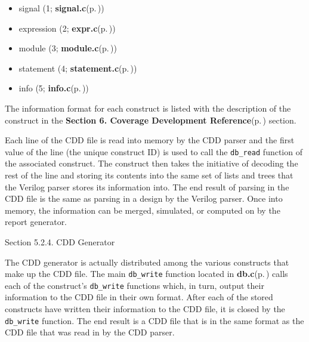 \begin{Desc}
\item[]\begin{itemize}
\item signal (1; {\bf signal.c}{\rm (p.\,\pageref{signal_8c})}) \item expression (2; {\bf expr.c}{\rm (p.\,\pageref{expr_8c})}) \item module (3; {\bf module.c}{\rm (p.\,\pageref{module_8c})}) \item statement (4; {\bf statement.c}{\rm (p.\,\pageref{statement_8c})}) \item info (5; {\bf info.c}{\rm (p.\,\pageref{info_8c})}) \end{itemize}
\end{Desc}
\begin{Desc}
\item[]The information format for each construct is listed with the description of the construct in the {\bf Section 6.  Coverage Development Reference}{\rm (p.\,\pageref{page_code_details})} section.\end{Desc}
\begin{Desc}
\item[]Each line of the CDD file is read into memory by the CDD parser and the first value of the line (the unique construct ID) is used to call the {\tt db\_\-read} function of the associated construct. The construct then takes the initiative of decoding the rest of the line and storing its contents into the same set of lists and trees that the Verilog parser stores its information into. The end result of parsing in the CDD file is the same as parsing in a design by the Verilog parser. Once into memory, the information can be merged, simulated, or computed on by the report generator.\end{Desc}




\begin{Desc}
\item[Section 5.2.4. CDD Generator]\end{Desc}
\begin{Desc}
\item[]The CDD generator is actually distributed among the various constructs that make up the CDD file. The main {\tt db\_\-write} function located in {\bf db.c}{\rm (p.\,\pageref{db_8c})} calls each of the construct's {\tt db\_\-write} functions which, in turn, output their information to the CDD file in their own format. After each of the stored constructs have written their information to the CDD file, it is closed by the {\tt db\_\-write} function. The end result is a CDD file that is in the same format as the CDD file that was read in by the CDD parser.\end{Desc}




